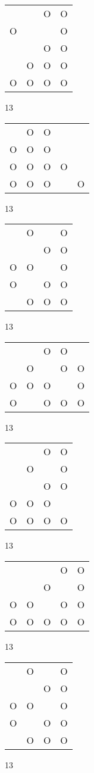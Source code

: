 \begin{tabular}{|m{0.2cm}m{0.2cm}m{0.2cm}m{0.2cm}|}\hline
 & &O&O\\
O& & &O\\
 & &O&O\\
 &O&O&O\\
O&O&O&O\\
\hline\end{tabular}13
\begin{tabular}{|m{0.2cm}m{0.2cm}m{0.2cm}m{0.2cm}m{0.2cm}|}\hline
 &O&O& & \\
O&O&O& & \\
O&O&O&O& \\
O&O&O& &O\\
\hline\end{tabular}13
\begin{tabular}{|m{0.2cm}m{0.2cm}m{0.2cm}m{0.2cm}|}\hline
 &O& &O\\
 & &O&O\\
O&O& &O\\
O& &O&O\\
 &O&O&O\\
\hline\end{tabular}13
\begin{tabular}{|m{0.2cm}m{0.2cm}m{0.2cm}m{0.2cm}m{0.2cm}|}\hline
 & &O&O& \\
 &O& &O&O\\
O&O&O& &O\\
O& &O&O&O\\
\hline\end{tabular}13
\begin{tabular}{|m{0.2cm}m{0.2cm}m{0.2cm}m{0.2cm}|}\hline
 & &O&O\\
 &O& &O\\
 & &O&O\\
O&O&O& \\
O&O&O&O\\
\hline\end{tabular}13
\begin{tabular}{|m{0.2cm}m{0.2cm}m{0.2cm}m{0.2cm}m{0.2cm}|}\hline
 & & &O&O\\
 & &O& &O\\
O&O& &O&O\\
O&O&O&O&O\\
\hline\end{tabular}13
\begin{tabular}{|m{0.2cm}m{0.2cm}m{0.2cm}m{0.2cm}|}\hline
 &O& &O\\
 & &O&O\\
O&O& &O\\
O& &O&O\\
 &O&O&O\\
\hline\end{tabular}13
